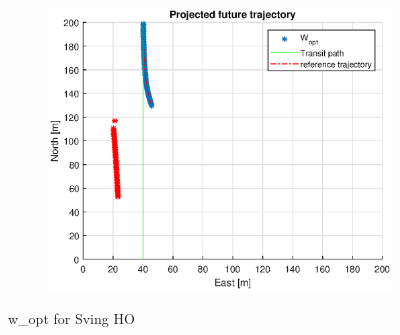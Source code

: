 \begin{figure}
    \hfill
    \begin{subfigure}[b]{0.5\textwidth}
        \centering
        \includegraphics[width=\textwidth]{Images/Figures/Sving_HO/simple0_f999_frame5}
    \end{subfigure}
    \caption{w\_opt for Sving HO}
\end{figure}



